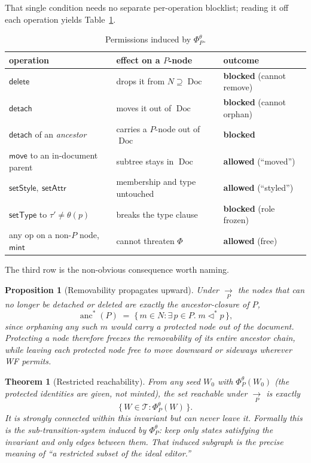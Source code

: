 \documentclass[11pt]{article}
\DeclareMathOperator{\Doc}{Doc}
\DeclareMathOperator{\anc}{anc}
\newcommand{\Tree}{\mathcal{T}}              %
\newcommand{\dleq}{\vartriangleleft^{*}}     %
\newcommand{\mint}{\mathsf{mint}}
\newcommand{\detach}{\mathsf{detach}}
\newcommand{\delete}{\mathsf{delete}}
\newcommand{\move}{\mathsf{move}}
\newcommand{\setType}{\mathsf{setType}}
\newcommand{\setStyle}{\mathsf{setStyle}}
\newcommand{\setAttr}{\mathsf{setAttr}}
\newcommand{\stepP}[1]{\xrightarrow[P]{\,#1\,}}
\theoremstyle{definition}
\theoremstyle{plain}
\newtheorem{theorem}[definition]{Theorem}
\newtheorem{proposition}[definition]{Proposition}
\begin{document}
That single condition needs no separate per-operation blocklist; reading it off
each operation yields Table~\ref{tab:perm}.

\begin{table}[h]
\centering
\begin{tabular}{@{}lll@{}}
\toprule
operation & effect on a $P$-node & outcome \\
\midrule
$\delete$                       & drops it from $N\supseteq\Doc$       & \textbf{blocked} (cannot remove)\\
$\detach$                       & moves it out of $\Doc$               & \textbf{blocked} (cannot orphan)\\
$\detach$ of an \emph{ancestor} & carries a $P$-node out of $\Doc$     & \textbf{blocked}\\
$\move$ to an in-document parent& subtree stays in $\Doc$              & \textbf{allowed} (``moved'')\\
$\setStyle,\ \setAttr$          & membership and type untouched        & \textbf{allowed} (``styled'')\\
$\setType$ to $\tau'\ne\theta(p)$ & breaks the type clause             & \textbf{blocked} (role frozen)\\
any op on a non-$P$ node, $\mint$ & cannot threaten $\Phi$             & \textbf{allowed} (free)\\
\bottomrule
\end{tabular}
\caption{Permissions induced by $\Phi^{\theta}_{P}$.}
\label{tab:perm}
\end{table}

The third row is the non-obvious consequence worth naming.

\begin{proposition}[Removability propagates upward]\label{prop:anc}
Under $\stepP{\,}$ the nodes that can no longer be detached or deleted are
exactly the ancestor-closure of $P$,
\[
  \anc^{*}(P)\;=\;\{\,m\in N : \exists\,p\in P.\; m\dleq p\,\},
\]
since orphaning any such $m$ would carry a protected node out of the document.
Protecting a node therefore freezes the removability of its entire ancestor
chain, while leaving each protected node free to move downward or sideways
wherever WF permits.
\end{proposition}

\begin{theorem}[Restricted reachability]\label{thm:restr}
From any seed $W_0$ with $\Phi^{\theta}_{P}(W_0)$ (the protected identities are
\emph{given}, not minted), the set reachable under $\stepP{\,}$ is exactly
\[
  \{\,W\in\Tree : \Phi^{\theta}_{P}(W)\,\}.
\]
It is strongly connected within this invariant but can never leave it. Formally
this is the sub-transition-system induced by $\Phi^{\theta}_{P}$: keep only
states satisfying the invariant and only edges between them. That induced
subgraph is the precise meaning of ``a restricted subset of the ideal editor.''
\end{theorem}
\end{document}
